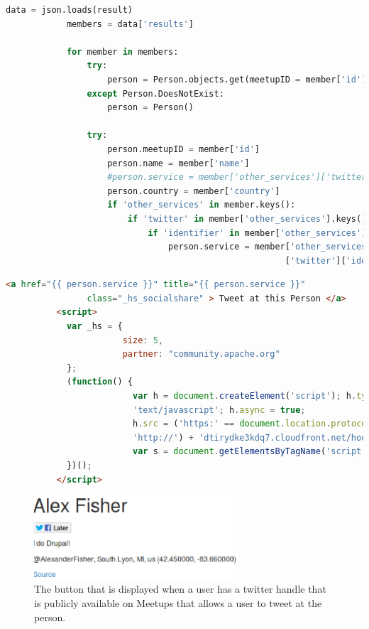 \documentclass[draftclsnofoot,10pt,onecolumn]{IEEEtran} %
\begin{document}
\begin{enumerate}[label*=\arabic*.]
\begin{center}
\begin{lstlisting}[caption=Views.py file where twitter handle is identified and stored, language=Python]
            data = json.loads(result)
            members = data['results']

            for member in members:
                try:
                    person = Person.objects.get(meetupID = member['id'])
                except Person.DoesNotExist:
                    person = Person()

                try:
                    person.meetupID = member['id']
                    person.name = member['name']
                    #person.service = member['other_services']['twitter']['identifier']
                    person.country = member['country']
                    if 'other_services' in member.keys():
                        if 'twitter' in member['other_services'].keys():
                            if 'identifier' in member['other_services']['twitter'].keys():
                                person.service = member['other_services'}
                                                       ['twitter']['identifier']
  \end{lstlisting}
\end{center}
    
  \begin{center}
  \captionsetup{width=.5\linewidth}
   \begin{lstlisting}[caption=View.py where the button for tweeting at a person is created and twitter handle is displayed., language=HTML]
        <a href="{{ person.service }}" title="{{ person.service }}" 
        		class="_hs_socialshare" > Tweet at this Person </a>
          <script>
            var _hs = {
                       size: 5,
                       partner: "community.apache.org"
            };
            (function() {
                         var h = document.createElement('script'); h.type = 
                         'text/javascript'; h.async = true;
                         h.src = ('https:' == document.location.protocol ? 'https://' : 
                         'http://') + 'dtirydke3kdq7.cloudfront.net/hootlet.js?v=1';
                         var s = document.getElementsByTagName('script')[0]; s.parentNode.insertBefore(h, s);
            })();
          </script>
   \end{lstlisting}
\end{center}

\begin{figure}[H]
  \begin{center}
  \includegraphics[width=3in, frame]{tweet_person1}
  	\captionsetup{width=.4\linewidth}
  \centering
  \caption{The button that is displayed when a user has a twitter handle that is publicly available on Meetups that allows a user to tweet at the person.}


\end{center}
\end{figure}
\end{enumerate}
\end{document}
